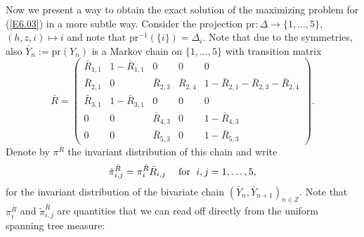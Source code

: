 \documentclass[11pt]{article}
\providecommand{\1}{\mathBB{1}}
\newcommand{\mf}{\quad\mbox{\;for \;}}
\newcommand{\Z}{{\mathbb{Z}}}
\newcommand{\equ}[1]{(\ref{#1})}
\begin{document}
Now we present a way to obtain the exact solution of the maximizing problem for \equ{E6.03} in a more subtle way. Consider the projection $\mathrm{pr}:\Delta\to\{1,\ldots,5\}$, $(h,z,i)\mapsto i$ and note that $\mathrm{pr}^{-1}(\{i\})=\Delta_i$. Note that due to the symmetries, also $\bar Y_n:=\mathrm{pr}(Y_n)$ is a Markov chain on $\{1,\ldots,5\}$ with transition matrix
\begin{equation}
\label{E6.07}
\bar R=\left(\begin{array}{ccccc}
\bar R_{1,1}&1-\bar R_{1,1}&0&0&0\\
\bar R_{2,1}&0&\bar R_{2,3}&\bar R_{2,4}&1-\bar R_{2,1}-\bar R_{2,3}-\bar R_{2,4}\\
\bar R_{3,1}&1-\bar R_{3,1}&0&0&0\\
0&0&\bar R_{4,3}&0&1-\bar R_{4,3}\\
0&0&\bar R_{5,3}&0&1-\bar R_{5,3}
\end{array}
\right).
\end{equation}
Denote by $\pi^{\bar R}$ the invariant distribution of this chain and write
\begin{equation}
\label{E6.08}
\tilde \pi^{\bar R}_{i,j}=\pi^{\bar R}_i\bar R_{i,j}\mf i,j=1,\ldots,5,
\end{equation}
for the invariant distribution of the bivariate chain $(\bar Y_n,\bar Y_{n+1})_{n\in\Z}$.
Note that $\pi^{\bar R}_i$ and $\tilde\pi^{\bar R}_{i,j}$ are quantities that we can read off directly from the uniform spanning tree measure:
\end{document}
